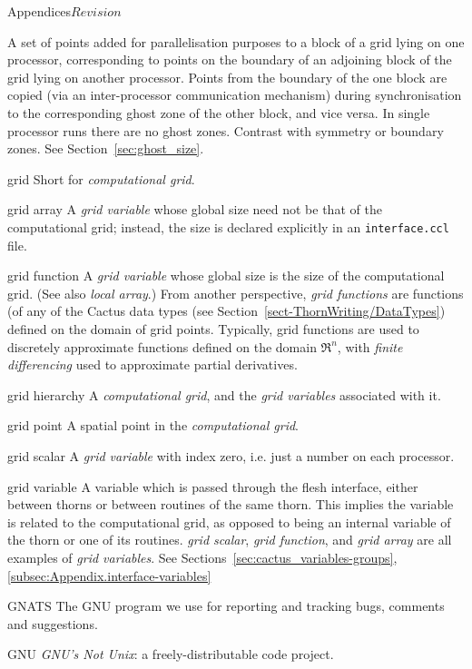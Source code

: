 \begin{cactuspart}{Appendices}{}{$Revision$}
\begin{Lentry}
  A set of points added for parallelisation purposes to a block of a
  grid lying on one processor, corresponding to points on the boundary
  of an adjoining block of the grid lying on another processor.
  Points from the boundary of the one block are copied (via an
  inter-processor communication mechanism) during synchronisation
  to the corresponding ghost zone of the other block, and vice versa.
  In single processor runs there are no ghost zones.
  Contrast with symmetry or boundary zones.
  See Section~\ref{sec:ghost_size}.
\item[grid]
  Short for \textit{computational grid}.
\item[grid array]
  A \textit{grid variable} whose global size need not be that of the
  computational grid; instead, the size is declared explicitly in an
  \verb|interface.ccl| file.  
\item[grid function]
  A \textit{grid variable} whose global size is the size of the
  computational grid.  (See also \textit{local array}.)
  From another perspective,
  \textit{grid functions} are functions (of any of the Cactus
  data types (see Section~\ref{sect-ThornWriting/DataTypes})
  defined on the domain of grid points.
  Typically, grid functions are used to discretely approximate functions
  defined on the domain $\Re^n$, with \textit{finite differencing}
  used to approximate partial derivatives.
\item[grid hierarchy]
  A \textit{computational grid}, and the \textit{grid variables} associated
  with it.
\item[grid point]
  A spatial point in the \textit{computational grid}.
\item[grid scalar]
  A \textit{grid variable} with index zero,
  i.e. just a number on each processor.
\item[grid variable]
  A variable which is passed through the flesh interface, either between 
  thorns or between routines of the same thorn.
  This implies the variable is related to the computational grid, as opposed
  to being an internal variable of the thorn or one of its routines. 
  \textit{grid scalar}, \textit{grid function}, and \textit{grid array}
  are all examples of \textit{grid variables}. 
  See Sections~\ref{sec:cactus_variables-groups},
  \ref{subsec:Appendix.interface-variables}
\item[GNATS]
  The GNU program we use for reporting and tracking bugs, comments and
  suggestions.
\item[GNU]
  \textit{GNU's Not Unix}: a freely-distributable code project.  

\end{Lentry}
\end{cactuspart}
